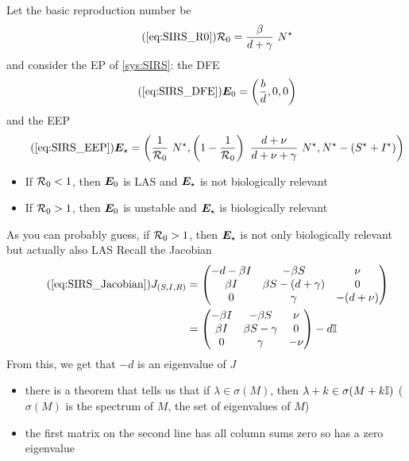 \documentclass[aspectratio=169]{beamer}\usepackage[]{graphicx}\usepackage[]{xcolor}
\begin{document}
\begin{frame}
\begin{theorem}\label{th:SIRS_LAS_DFE}
Let the basic reproduction number be
\begin{equation}\tag{\ref{eq:SIRS_R0}}
\R_0 = \frac\beta{d+\gamma}\ N^\star
\end{equation}
and consider the EP of \eqref{sys:SIRS}: the DFE
\begin{equation}\tag{\ref{eq:SIRS_DFE}}
\bE_0=
\left(\frac bd, 0, 0\right)
\end{equation}
and the EEP
\begin{equation}\tag{\ref{eq:SIRS_EEP}}
\bE_\star=
\left(
\frac{1}{\R_0}\ N^\star,
\left(1-\frac{1}{\R_0}\right)\
\frac{d+\nu}{d+\nu+\gamma}\ N^\star,
N^\star-(S^\star+I^\star)
\right)
\end{equation}
\vskip0.5cm
\begin{itemize}
\item If $\mathcal{R}_0<1$, then $\bm{E}_0$ is LAS and $\bm{E}_\star$ is not biologically relevant
\item If $\mathcal{R}_0>1$, then $\bm{E}_0$ is unstable and $\bm{E}_\star$ is biologically relevant
\end{itemize}
\end{theorem}
\end{frame}

\begin{frame}
As you can probably guess, if $\mathcal{R}_0>1$, then $\bm{E}_\star$ is not only biologically relevant but actually also LAS
\vfill
Recall the Jacobian
\begin{align}
\tag{\ref{eq:SIRS_Jacobian}}
J_{(S,I,R)} &=
\begin{pmatrix}
-d-\beta I & -\beta S & \nu \\
\beta I & \beta S-(d+\gamma) & 0 \\
0 & \gamma & -(d+\nu)
\end{pmatrix} \\
&= \begin{pmatrix}
-\beta I & -\beta S & \nu \\
\beta I & \beta S-\gamma & 0 \\
0 & \gamma & -\nu
\end{pmatrix}
-d\II  \nonumber
\end{align}
\vfill
From this, we get that $-d$ is an eigenvalue of $J$
\begin{itemize}
\item there is a theorem that tells us that if $\lambda\in\sigma(M)$, then $\lambda+k\in\sigma(M+k\mathbb{I})$ \qquad($\sigma(M)$ is the spectrum of $M$, the set of eigenvalues of $M$)
\item the first matrix on the second line has all column sums zero so has a zero eigenvalue
\end{itemize}
\end{frame}
\end{document}
